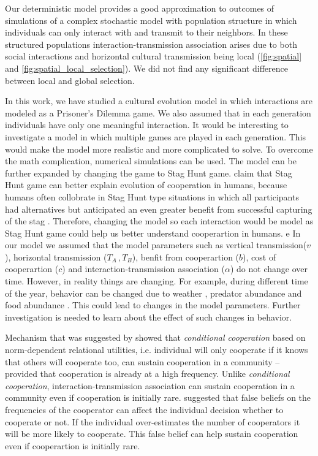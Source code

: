 \documentclass[12pt]{extarticle}
\begin{document}
Our deterministic model provides a good approximation to outcomes of simulations of a complex stochastic model with population structure in which individuals can only interact with and transmit to their neighbors.
In these structured populations interaction-transmission association arises due to both social interactions and horizontal cultural transmission being local (\autoref{fig:spatial} and \autoref{fig:spatial_local_selection}).
We did not find any significant difference between local and global selection. 

In this work, we have studied a cultural evolution model in which interactions are modeled as a Prisoner's Dilemma game.
We also assumed that in each generation individuals have only one meaningful interaction.
It would be interesting to investigate a model in which multiple games are played in each generation. 
This would make the model more realistic and more complicated to solve. To overcome the math complication, numerical simulations can be used. 
The model can be further expanded by changing the game to Stag Hunt game. \citet{tomasello2012two} claim that Stag Hunt game can better explain evolution of cooperation in humans,
because humans often collobrate in Stag Hunt type situations in which all participants had alternatives but anticipated an even greater benefit from
successful capturing of the stag \citep{mitani2012evolution}. Therefore, changing the model so each interaction would be model as Stag Hunt game could help us better understand cooperartion in humans.
e
In our model we assumed that the model parameters such as vertical transmission($v$), horizontal transmission ($T_A \,, T_B$), benfit from cooperartion ($b$), cost of cooperartion ($c$) and interaction-transmission association ($\alpha$) do not change over time.
However, in reality things are changing. For example, during different time of the year, behavior can be changed due to weather \citep{azcarate2007microclimatic}, predator abundance \citep{briffa2008comparing} and food abundance \citep{johnson2001foraging}.
This could lead to changes in the model parameters.
Further investigation is needed to learn about the effect of such changes in behavior.

Mechanism that was suggested by \citet{traxler2011social} showed that \emph{conditional cooperation} based on norm-dependent relational utilities, i.e. individual will only cooperate if it knows that others will cooperate too, can sustain cooperation in a community – provided that cooperation is already at a high frequency.
Unlike \emph{conditional cooperation}, interaction-transmission association can sustain cooperation in a community even if cooperation is initially rare. 
\citet{morsky2020false} suggested that false beliefs on the frequencies of the cooperator can affect the individual decision whether to cooperate or not. If the individual over-estimates the number of cooperators it will be more likely to cooperate. This false belief can help sustain cooperation even if cooperartion is initially rare. 
\end{document}
